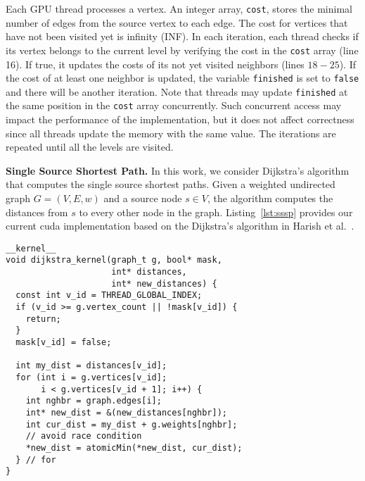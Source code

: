 Each GPU thread processes a vertex. An integer array, \texttt{cost}, stores the minimal number of edges from the source vertex to each edge. The cost for vertices that have not been visited yet is infinity (INF). In each iteration, each thread checks if its vertex belongs to the current level by verifying the cost in the \texttt{cost} array (line 16). If true, it updates the costs of its not yet visited neighbors (lines $18-25$). If the cost of at least one neighbor is updated, the variable \texttt{finished} is set to \texttt{false} and there will be another iteration. Note that threads may update \texttt{finished} at the same position in the \texttt{cost} array concurrently. Such concurrent access may impact the performance of the implementation, but it does not affect correctness since all threads update the memory with the same value. The iterations are repeated until all the levels are visited.

{\bf Single Source Shortest Path.} In this work, we consider Dijkstra's algorithm that computes the single source shortest paths. Given a weighted undirected graph $G = (V, E, w)$ and a source node $s \in V$, the algorithm computes the distances from $s$ to every other node in the graph. Listing~\ref{lst:sssp} provides our current {\sc cuda} implementation based on the Dijkstra's algorithm in Harish et al.~\cite{Harish2007}.


\begin{lstlisting}[caption=GPU implementation of Single Source Shortest Path algorithm,label=lst:sssp]
__kernel__
void dijkstra_kernel(graph_t g, bool* mask, 
                     int* distances, 
                     int* new_distances) {
  const int v_id = THREAD_GLOBAL_INDEX;
  if (v_id >= g.vertex_count || !mask[v_id]) {
    return;
  }
  mask[v_id] = false;

  int my_dist = distances[v_id];
  for (int i = g.vertices[v_id]; 
       i < g.vertices[v_id + 1]; i++) {
    int nghbr = graph.edges[i];
    int* new_dist = &(new_distances[nghbr]);
    int cur_dist = my_dist + g.weights[nghbr];
    // avoid race condition
    *new_dist = atomicMin(*new_dist, cur_dist);
  } // for
}
\end{lstlisting}

